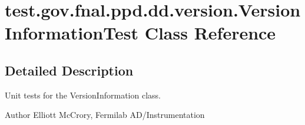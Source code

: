 \hypertarget{classtest_1_1gov_1_1fnal_1_1ppd_1_1dd_1_1version_1_1VersionInformationTest}{\section{test.\-gov.\-fnal.\-ppd.\-dd.\-version.\-Version\-Information\-Test Class Reference}
\label{classtest_1_1gov_1_1fnal_1_1ppd_1_1dd_1_1version_1_1VersionInformationTest}
}


\subsection{Detailed Description}
Unit tests for the Version\-Information class.

\begin{DoxyAuthor}{Author}
Elliott Mc\-Crory, Fermilab A\-D/\-Instrumentation 
\end{DoxyAuthor}
